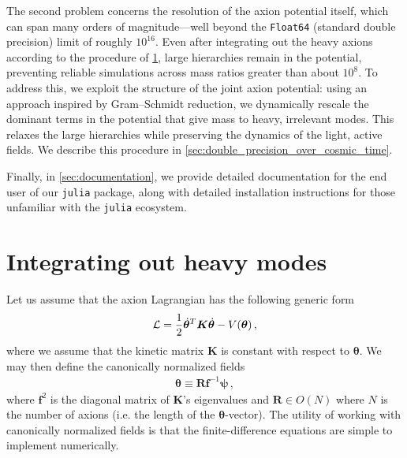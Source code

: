 \documentclass{article}
\begin{document}
The second problem concerns the resolution of the axion potential itself, which can span many orders of magnitude—well beyond the \texttt{Float64} (standard double precision) limit of roughly $10^{16}$. Even after integrating out the heavy axions according to the procedure of \cref{sec:integrating_out_heavy_modes}, large hierarchies remain in the potential, preventing reliable simulations across mass ratios greater than about $10^8$. To address this, we exploit the structure of the joint axion potential: using an approach inspired by Gram--Schmidt reduction, we dynamically rescale the dominant terms in the potential that give mass to heavy, irrelevant modes. This relaxes the large hierarchies while preserving the dynamics of the light, active fields. We describe this procedure in \cref{sec:double_precision_over_cosmic_time}.

Finally, in \cref{sec:documentation}, we provide detailed documentation for the end user of our \texttt{julia} package, along with detailed installation instructions for those unfamiliar with the \texttt{julia} ecosystem.

\section{Integrating out heavy modes}\label{sec:integrating_out_heavy_modes}
Let us assume that the axion Lagrangian has the following generic form
\begin{align}
    {\cal L} = \frac12\dot{\bm\theta}^T{\bm K}\dot{\bm\theta} - V(\bm\theta)\,,
\end{align}
where we assume that the kinetic matrix ${\bm K}$ is constant with respect to $\bm\theta$. We may then define the canonically normalized fields
\begin{align}
    {\bm\theta}\equiv \bm R\bm f^{-1}\bm \psi\,,
\end{align}
where $\bm f^2$ is the diagonal matrix of $\bm K$'s eigenvalues and $\bm R\in O(N)$ where $N$ is the number of axions (i.e. the length of the $\bm\theta$-vector). The utility of working with canonically normalized fields is that the finite-difference equations are simple to implement numerically.
\end{document}
